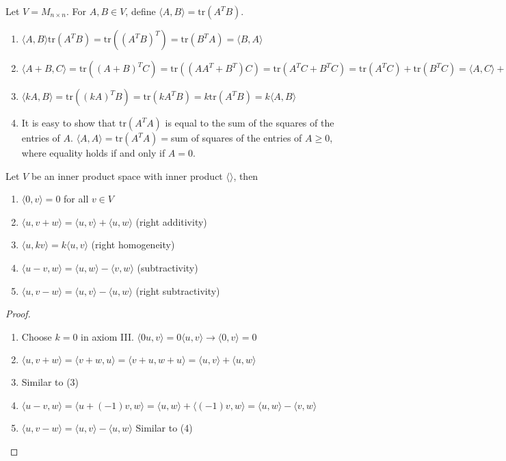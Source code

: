 \documentclass[12pt]{article}
\begin{document}
\begin{example} Let $V = M_{n \times n}$. For $A, B \in V$, define $\langle A, B \rangle = \mathrm{tr}(A^TB)$. \begin{enumerate} 
\item $\langle A, B \rangle \mathrm{tr}(A^TB) = \mathrm{tr}((A^TB)^T) = \mathrm{tr}(B^TA) = \langle B, A \rangle$
\item $\langle A + B, C \rangle = \mathrm{tr}((A + B)^TC) = \mathrm{tr}((AA^T + B^T)C) = \mathrm{tr}(A^TC + B^TC) = \mathrm{tr}(A^TC) + \mathrm{tr}(B^TC) = \langle A, C \rangle + \langle B, C \rangle $ 
\item $ \langle kA, B \rangle = \mathrm{tr}((kA)^TB) = \mathrm{tr}(kA^TB) = k\mathrm{tr}(A^TB) = k\langle A, B \rangle $ 
\item It is easy to show that $\mathrm{tr}(A^TA)$ is equal to the sum of the squares of the entries of $A$. \newline $\langle A, A \rangle = \mathrm{tr}(A^TA) = $sum of squares of the entries of $A \geq 0$, where equality holds if and only if $A = 0$. \end{enumerate} \end{example} 
\begin{theorem} Let $V$ be an inner product space with inner product $\langle \rangle$, then \begin{enumerate} 
\item $\langle 0, v \rangle = 0$ for all $v \in V$ 
\item $\langle u, v + w \rangle = \langle u, v \rangle + \langle u, w \rangle $ (right additivity) 
\item $\langle u, kv \rangle = k\langle u, v\rangle $ (right homogeneity) 
\item $\langle u - v, w \rangle = \langle u, w \rangle - \langle v, w \rangle $ (subtractivity)
\item $\langle u, v - w \rangle = \langle u, v \rangle - \langle u, w \rangle $ (right subtractivity) \end{enumerate} \end{theorem}
\begin{proof} \begin{enumerate} 
\item Choose $k = 0$ in axiom III. $\langle 0u, v \rangle = 0\langle u, v \rangle \rightarrow \langle 0, v \rangle = 0$ 
\item $\langle u, v + w \rangle = \langle v + w, u \rangle = \langle v + u, w + u \rangle = \langle u, v \rangle + \langle u, w \rangle $
\item Similar to (3) 
\item $\langle u - v, w \rangle = \langle u + (-1)v, w \rangle = \langle u, w \rangle + \langle (-1)v, w \rangle = \langle u, w \rangle - \langle v, w \rangle $
\item $\langle u, v - w \rangle = \langle u, v \rangle - \langle u, w \rangle $ Similar to (4) \end{enumerate} \end{proof} 
\end{document}
